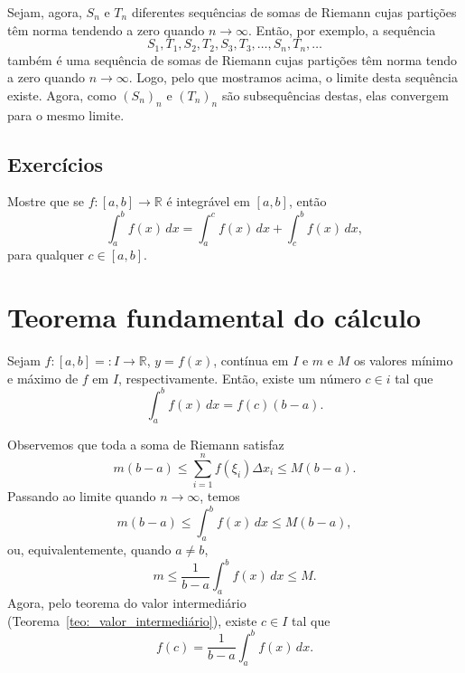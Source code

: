 \begin{dem}
Sejam, agora, $S_n$ e $T_n$ diferentes sequências de somas de Riemann cujas partições têm norma tendendo a zero quando $n\to\infty$. Então, por exemplo, a sequência
\begin{equation}
  S_1, T_1, S_2, T_2, S_3, T_3, \dotsc, S_n, T_n, \ldots
\end{equation}
também é uma sequência de somas de Riemann cujas partições têm norma tendo a zero quando $n\to\infty$. Logo, pelo que mostramos acima, o limite desta sequência existe. Agora, como $(S_n)_n$ e $(T_n)_n$ são subsequências destas, elas convergem para o mesmo limite.
\end{dem}

\subsection*{Exercícios}

\begin{exer}
  Mostre que se $f:[a, b]\to\mathbb{R}$ é integrável em $[a, b]$, então
  \begin{equation}
    \int_a^b f(x)\,dx = \int_a^c f(x)\,dx + \int_c^b f(x)\,dx,
  \end{equation}
para qualquer $c\in [a, b]$.
\end{exer}

\section{Teorema fundamental do cálculo}

\begin{teo}\label{teo:da_média}
  Sejam $f:[a,b]=:I\to\mathbb{R}$, $y=f(x)$, contínua em $I$ e $m$ e $M$ os valores mínimo e máximo de $f$ em $I$, respectivamente. Então, existe um número $c\in i$ tal que
  \begin{equation}
    \int_a^b f(x)\,dx = f(c)(b-a).
  \end{equation}
\end{teo}
\begin{dem}
  Observemos que toda a soma de Riemann satisfaz
  \begin{equation}
    m(b-a) \leq \sum_{i=1}^n f(\xi_i)\Delta x_i \leq M(b-a).
  \end{equation}
Passando ao limite quando $n\to \infty$, temos
\begin{equation}
    m(b-a) \leq \int_a^b f(x)\,dx \leq M(b-a),
\end{equation}
ou, equivalentemente, quando $a\neq b$,
\begin{equation}
    m \leq \frac{1}{b-a}\int_a^b f(x)\,dx \leq M.
\end{equation}
Agora, pelo teorema do valor intermediário (Teorema~\ref{teo:_valor_intermediário}), existe $c\in I$ tal que
\begin{equation}
  f(c) = \frac{1}{b-a}\int_a^b f(x)\,dx.
\end{equation}
\end{dem}

